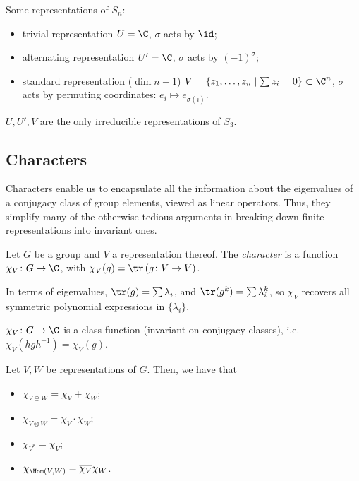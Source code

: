 \documentclass{notes}
\begin{document}
\begin{example}
    Some representations of $S_n$:
    \begin{itemize}
        \item trivial representation $U=\C$, $\sigma$ acts by $\id $;
        \item alternating representation $U'=\C $, $\sigma $ acts by $(-1)^{\sigma }$;
        \item  standard representation ($\dim n-1$) $V=\left\{ {z}_{1},\ldots,{z}_{n} \mid  \sum z_i=0 \right\} \subset \C ^{n}$, $\sigma $ acts by permuting coordinates: $e_i\mapsto e_{\sigma (i)}$.
    \end{itemize}

    $U,U',V$ are the only irreducible representations of $S_3$.
\end{example}

\subsection{Characters}

Characters enable us to encapsulate all the information about the eigenvalues of a conjugacy class of group elements, viewed as linear operators. Thus, they simplify many of the otherwise tedious arguments in breaking down finite representations into invariant ones.

\begin{theorem}
    Let $G$ be a group and $V$ a representation thereof. The \emph{character} is a function $\chi _V\colon G\to \C $, with $\chi _V(g)=\tr \left( g\colon V \to V  \right) $.
\end{theorem}

\begin{remark}
    In terms of eigenvalues, $\tr (g)=\sum \lambda_i$, and $\tr (g^k)=\sum \lambda _i^k$, so $\chi _V$ recovers all symmetric polynomial expressions in $\{{\lambda }_i\}$.
\end{remark}

\begin{fact}
    $\chi _V\colon G\to \C $ is a class function (invariant on conjugacy classes), i.e. $\chi _V(hgh^{-1})=\chi _V(g)$.
\end{fact}

\begin{theorem}
    Let $V,W$ be representations of $G$. Then, we have that
    \begin{itemize}
        \item $\chi _{V\oplus W}=\chi _V+\chi _W$;
        \item $\chi _{V\otimes W}=\chi _V\cdot \chi _W$;
        \item $\chi _{V^{*}}=\overline{\chi _V}$;
        \item $\chi _{\Hom (V,W)}=\overline{\chi _V}\chi _W$.
    \end{itemize}
\end{theorem}
\end{document}
